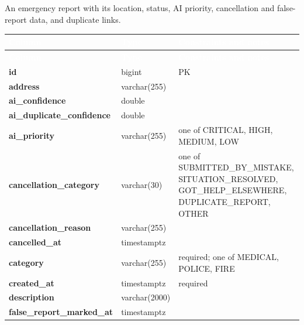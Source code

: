 \subsection*{}
An emergency report with its location, status, AI priority, cancellation and false-report data, and duplicate links.\par\vspace{2pt}
{\tabfont\rowband
\begin{longtable}{@{}>{\raggedright\arraybackslash}p{}>{\raggedright\arraybackslash}p{}>{\raggedright\arraybackslash}p{}@{}}
\rowcolor{najdanavy}\textcolor{white}{\sffamily\bfseries\small Column} & \textcolor{white}{\sffamily\bfseries\small Type} & \textcolor{white}{\sffamily\bfseries\small Constraints and notes}\\
\endfirsthead
\rowcolor{najdanavy}\textcolor{white}{\sffamily\bfseries\small Column} & \textcolor{white}{\sffamily\bfseries\small Type} & \textcolor{white}{\sffamily\bfseries\small Constraints and notes}\\
\endhead
\bottomrule\endlastfoot
\textbf{id} & bigint & PK\\
\textbf{address} & varchar(255) & \\
\textbf{ai\_\allowbreak{}confidence} & double & \\
\textbf{ai\_\allowbreak{}duplicate\_\allowbreak{}confidence} & double & \\
\textbf{ai\_\allowbreak{}priority} & varchar(255) & one of CRITICAL, HIGH, MEDIUM, LOW\\
\textbf{cancellation\_\allowbreak{}category} & varchar(30) & one of SUBMITTED\_\allowbreak{}BY\_\allowbreak{}MISTAKE, SITUATION\_\allowbreak{}RESOLVED, GOT\_\allowbreak{}HELP\_\allowbreak{}ELSEWHERE, DUPLICATE\_\allowbreak{}REPORT, OTHER\\
\textbf{cancellation\_\allowbreak{}reason} & varchar(255) & \\
\textbf{cancelled\_\allowbreak{}at} & timestamptz & \\
\textbf{category} & varchar(255) & required; one of MEDICAL, POLICE, FIRE\\
\textbf{created\_\allowbreak{}at} & timestamptz & required\\
\textbf{description} & varchar(2000) & \\
\textbf{false\_\allowbreak{}report\_\allowbreak{}marked\_\allowbreak{}at} & timestamptz & \\

\end{longtable}}
